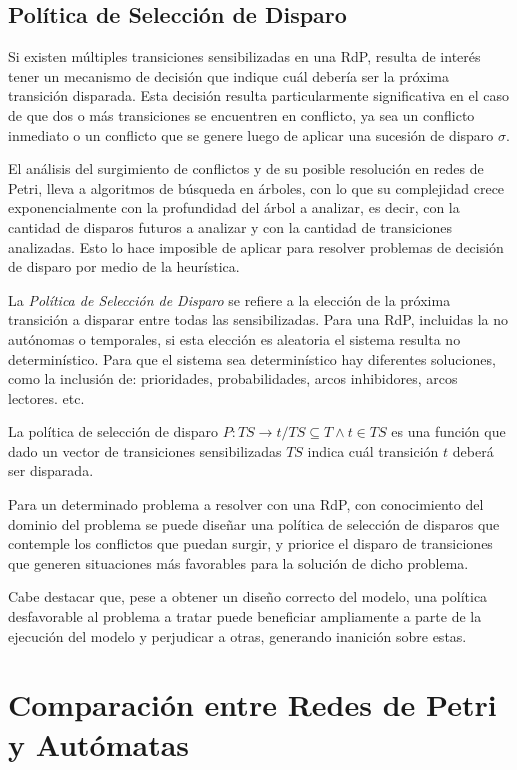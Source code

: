 \subsection{Política de Selección de Disparo}

Si existen múltiples transiciones sensibilizadas en una RdP, resulta de interés
tener un mecanismo de decisión que indique cuál debería ser la próxima
transición disparada.
Esta decisión resulta particularmente significativa en el caso de que dos o más
transiciones se encuentren en conflicto, ya sea un conflicto inmediato o un
conflicto que se genere luego de aplicar una sucesión de disparo $\sigma$.

El análisis del surgimiento de conflictos y de su posible resolución en redes de
Petri, lleva a algoritmos de búsqueda en árboles, con lo que su complejidad
crece exponencialmente con la profundidad del árbol a analizar, es decir, con
la cantidad de disparos futuros a analizar y con la cantidad de transiciones
analizadas. Esto lo hace imposible de aplicar para resolver problemas de
decisión de disparo por medio de la heurística.

La \textit{Política de Selección de Disparo} se refiere a la elección de la
próxima transición a disparar entre todas las sensibilizadas. Para una RdP,
incluidas la no autónomas o temporales, si esta elección es aleatoria el sistema
resulta no determinístico. Para que el sistema sea determinístico hay diferentes
soluciones, como la inclusión de: prioridades, probabilidades, arcos
inhibidores, arcos lectores. etc. \cite{Ecuacion_generalizada_LAC}

La política de selección de disparo $P : TS \rightarrow t \slash TS \subseteq T
\land t \in TS $ es una función que dado un vector de transiciones
sensibilizadas $TS$ indica cuál transición $t$ deberá ser disparada.

Para un determinado problema a resolver con una RdP, con conocimiento del
dominio del problema se puede diseñar una política de selección de disparos que
contemple los conflictos que puedan surgir, y priorice el disparo de
transiciones que generen situaciones más favorables para la solución de dicho
problema.

Cabe destacar que, pese a obtener un diseño correcto del modelo, una política
desfavorable al problema a tratar puede beneficiar ampliamente a parte de la
ejecución del modelo y perjudicar a otras, generando inanición sobre estas.


\section{Comparación entre Redes de Petri y Autómatas}


